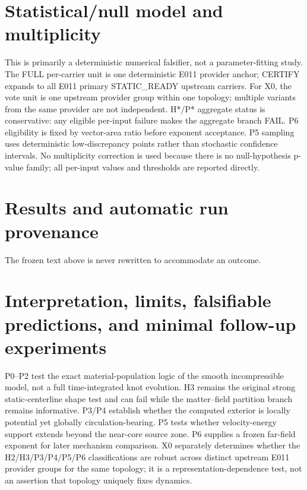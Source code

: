 \documentclass[11pt,a4paper]{article}
\begin{document}
\section{Statistical/null model and multiplicity}
This is primarily a deterministic numerical falsifier, not a parameter-fitting study. The FULL per-carrier unit is one deterministic E011 provider anchor; CERTIFY expands to all E011 primary STATIC\_READY upstream carriers. For X0, the vote unit is one upstream provider group within one topology; multiple variants from the same provider are not independent. H*/P* aggregate status is conservative: any eligible per-input failure makes the aggregate branch FAIL. P6 eligibility is fixed by vector-area ratio before exponent acceptance. P5 sampling uses deterministic low-discrepancy points rather than stochastic confidence intervals. No multiplicity correction is used because there is no null-hypothesis p-value family; all per-input values and thresholds are reported directly.

\section{Results and automatic run provenance}
The frozen text above is never rewritten to accommodate an outcome.

\section{Interpretation, limits, falsifiable predictions, and minimal follow-up experiments}
P0--P2 test the exact material-population logic of the smooth incompressible model, not a full time-integrated knot evolution. H3 remains the original strong static-centerline shape test and can fail while the matter--field partition branch remains informative. P3/P4 establish whether the computed exterior is locally potential yet globally circulation-bearing. P5 tests whether velocity-energy support extends beyond the near-core source zone. P6 supplies a frozen far-field exponent for later mechanism comparison. X0 separately determines whether the H2/H3/P3/P4/P5/P6 classifications are robust across distinct upstream E011 provider groups for the same topology; it is a representation-dependence test, not an assertion that topology uniquely fixes dynamics.
\end{document}

